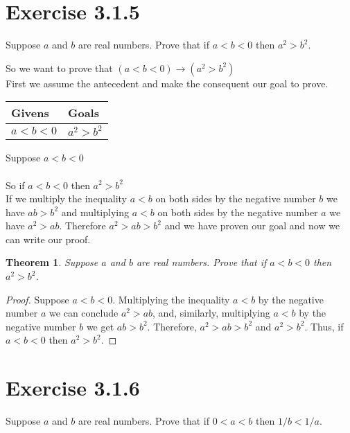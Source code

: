 \documentclass{article}
\newcommand{\n}{ \noindent }
\newtheorem*{theorem}{Theorem}  %
\begin{document}
\section{Exercise 3.1.5}
Suppose $a$ and $b$ are real numbers. Prove that if $a<b<0$ then $a^2 > b^2$.

\n So we want to prove that 
$(a<b<0) \rightarrow (a^2 > b^2)$ \\

\n First we assume the antecedent and make the consequent our goal to prove.

\begin{table}[h]
\begin{tabular}{ll}
\hline
Givens & Goals   \\ \hline
$a<b<0$ & $a^2 > b^2$   \\ \hline
\end{tabular}
\end{table}

\n Suppose $a<b<0$ \\
\indent [proof of $a^2 > b^2$ ] \\
\n So if $a<b<0$ then $a^2 > b^2$ \\

\n If we multiply the inequality $a<b$ on both sides by the negative number $b$ we have $ab>b^2$ and multiplying $a<b$ on both sides by the negative number $a$ we have $a^2>ab$. Therefore $a^2 > ab > b^2$ and we have proven our goal and now we can write our proof.

\begin{theorem} Suppose $a$ and $b$  are real numbers. Prove that if $a<b<0$ then $a^2 > b^2$. 
\end{theorem}
\begin{proof}
Suppose $a<b<0$. Multiplying the inequality $a<b$ by the negative number $a$ we can conclude $a^2 > ab$, and, similarly, multiplying $a<b$ by the negative number $b$ we get $ab>b^2$. Therefore, $a^2>ab>b^2$ and $a^2>b^2$. Thus, if $a<b<0$ then $a^2>b^2$.
\end{proof}


\section{Exercise 3.1.6}
Suppose $a$ and $b$ are real numbers. Prove that if $0<a<b$ then $1/b < 1/a$.
\end{document}
